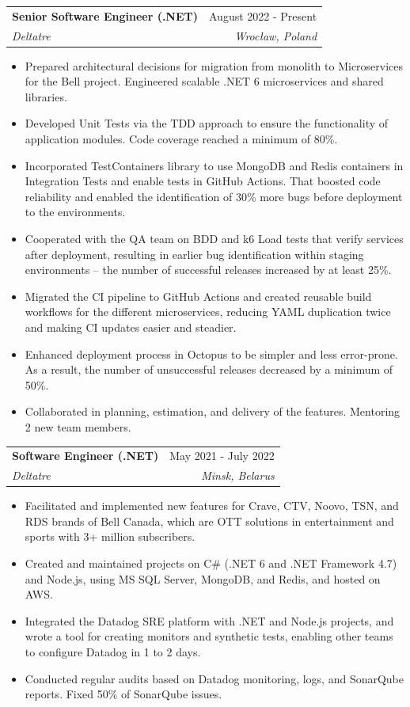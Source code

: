 \documentclass[letterpaper,11pt]{article}
\makeatletter
\newcommand{\resumeItem}[1]{
  \item\small{
    {#1 \vspace{-2pt}}
  }
}
\newcommand{\resumeSubheading}[4]{
  \vspace{-2pt}\item
    \begin{tabular*}{0.97\textwidth}[t]{l@{\extracolsep{\fill}}r}
      \textbf{#1} & #2 \\
      \textit{\small#3} & \textit{\small #4} \\
    \end{tabular*}\vspace{-7pt}
}
\newcommand{\resumeItemListStart}{\begin{itemize}}
\newcommand{\resumeItemListEnd}{\end{itemize}\vspace{-5pt}}
\makeatother
\begin{document}
    \resumeSubheading
      {Senior Software Engineer (.NET)}{ August 2022 - Present}
      {Deltatre}{ Wrocław, Poland}
      \resumeItemListStart
        \resumeItem{Prepared architectural decisions
        for migration from monolith to Microservices for the Bell project. Engineered scalable .NET 6 microservices and shared libraries.}
        \resumeItem{Developed Unit Tests via the TDD approach to ensure the functionality of application modules.
        Code coverage reached a minimum of 80\%.}
        \resumeItem{Incorporated TestContainers library to use MongoDB and Redis containers in Integration Tests and enable tests in GitHub Actions.
         That boosted code reliability and enabled the identification of 30\% more bugs before deployment to the environments.}
        \resumeItem{Cooperated with the QA team on BDD and k6 Load tests that verify services after deployment,
        resulting in earlier bug identification within staging environments -- the number of successful releases increased by at least 25\%.}%
        \resumeItem{Migrated the CI pipeline to GitHub Actions and created reusable build workflows for the different microservices, reducing YAML duplication twice and making CI updates easier and steadier.}
        \resumeItem{Enhanced deployment process in Octopus to be simpler and less error-prone. As a result, the number of unsuccessful releases decreased by a minimum of 50\%.}
        \resumeItem{Collaborated in planning, estimation, and delivery of the features. Mentoring 2 new team members.}
      \resumeItemListEnd
      
    \resumeSubheading
      {Software Engineer (.NET)}{ May 2021 - July 2022}
      {Deltatre}{ Minsk, Belarus}
      \resumeItemListStart
        \resumeItem{Facilitated and implemented new features for Crave, CTV, Noovo, TSN, and RDS brands of Bell Canada, which are OTT solutions in entertainment and sports with 3+ million subscribers.}
        \resumeItem{Created and maintained projects on C\# (.NET 6 and .NET Framework 4.7) and Node.js, using MS SQL Server, MongoDB, and Redis, and hosted on AWS.} 
        \resumeItem{Integrated the Datadog SRE platform with .NET and Node.js projects, and wrote a tool for creating monitors
        and synthetic tests, enabling other teams to configure Datadog in 1 to 2 days.}
        \resumeItem{Conducted regular audits based on Datadog monitoring, logs, and SonarQube reports. Fixed 50\% of SonarQube issues.}
    \resumeItemListEnd
\end{document}

